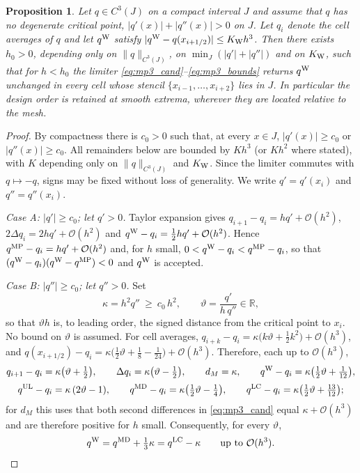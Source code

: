 \documentclass[a4paper,fleqn]{cas-sc}
\newtheorem{proposition}[theorem]{Proposition}
\theoremstyle{remark}
\begin{document}
\begin{proposition}\label{prop:mp3}
Let $q\in C^3(J)$ on a compact interval $J$ and assume that $q$ has no
degenerate critical point, $|q'(x)|+|q''(x)|>0$ on $J$. Let $q_i$ denote the
cell averages of $q$ and let $q^{\rm W}$ satisfy
$|q^{\rm W}-q(x_{i+1/2})|\le K_{\rm W}h^3$. Then there exists $h_0>0$,
depending only on $\|q\|_{C^3(J)}$, on $\min_J(|q'|+|q''|)$ and on
$K_{\rm W}$, such that for $h<h_0$ the limiter
\eqref{eq:mp3_cand}--\eqref{eq:mp3_bounds} returns $q^{\rm W}$ unchanged in every cell whose
stencil $\{x_{i-1},\dots,x_{i+2}\}$ lies in $J$. In particular the design
order is retained at smooth extrema, wherever they are located relative to
the mesh.
\end{proposition}
 
\begin{proof}
By compactness there is $c_0>0$ such that, at every $x\in J$,
$|q'(x)|\ge c_0$ or $|q''(x)|\ge c_0$. All remainders below are bounded by
$Kh^3$ (or $Kh^2$ where stated), with $K$ depending only on
$\|q\|_{C^3(J)}$ and $K_{\rm W}$. Since the limiter commutes with
$q\mapsto-q$, signs may be fixed without loss of generality. We write
$q'=q'(x_i)$ and $q''=q''(x_i)$.
 
\emph{Case A: $|q'|\ge c_0$; let $q'>0$.} Taylor expansion gives
$q_{i+1}-q_i=hq'+\mathcal O(h^2)$, $2\Delta q_i=2hq'+\mathcal O(h^2)$ and
$q^{\rm W}-q_i=\tfrac12hq'+\mathcal O(h^2)$. Hence
$q^{\rm MP}-q_i=hq'+\mathcal O(h^2)$ and, for $h$ small,
$0<q^{\rm W}-q_i<q^{\rm MP}-q_i$, so that
$(q^{\rm W}-q_i)(q^{\rm W}-q^{\rm MP})<0$ and $q^{\rm W}$ is accepted.
 
\emph{Case B: $|q''|\ge c_0$; let $q''>0$.} Set
\[
\kappa=h^2q''\ \ge\ c_0\,h^2,\qquad
\vartheta=\frac{q'}{h\,q''}\in\mathbb R ,
\]
so that $\vartheta h$ is, to leading order, the signed distance from the
critical point to $x_i$. No bound on $\vartheta$ is assumed. For cell
averages,
$q_{i+k}-q_i=\kappa\bigl(k\vartheta+\tfrac12k^2\bigr)+\mathcal O(h^3)$, and
$q(x_{i+1/2})-q_i
=\kappa\bigl(\tfrac12\vartheta+\tfrac18-\tfrac1{24}\bigr)+\mathcal O(h^3)$.
Therefore, each up to $\mathcal O(h^3)$,
\begin{gather*}
q_{i+1}-q_i=\kappa\bigl(\vartheta+\tfrac12\bigr),\qquad
\Delta q_i=\kappa\bigl(\vartheta-\tfrac12\bigr),\qquad
d_M=\kappa,\qquad
q^{\rm W}-q_i=\kappa\bigl(\tfrac12\vartheta+\tfrac1{12}\bigr),\\[2pt]
q^{\rm UL}-q_i=\kappa\,(2\vartheta-1),\qquad
q^{\rm MD}-q_i=\kappa\bigl(\tfrac12\vartheta-\tfrac14\bigr),\qquad
q^{\rm LC}-q_i=\kappa\bigl(\tfrac12\vartheta+\tfrac{13}{12}\bigr);
\end{gather*}
for $d_M$ this uses that both second differences in \eqref{eq:mp3_cand} equal
$\kappa+\mathcal O(h^3)$ and are therefore positive for $h$ small.
Consequently, for every $\vartheta$,
\begin{equation}\label{eq:mp_ident}
q^{\rm W}=q^{\rm MD}+\tfrac13\kappa=q^{\rm LC}-\kappa
\qquad\text{up to }\mathcal O(h^3).
\end{equation}
 

\end{proof}
\end{document}
